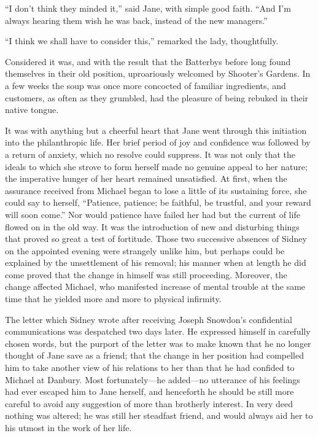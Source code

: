 ``I don't think they minded it,'' said Jane, with simple good faith.
``And I'm always hearing them wish he was back, instead of the new
managers.''

``I think we shall have to consider this,'' remarked the lady,
thoughtfully.

Considered it was, and with the result that the Batterbys before long
found themselves in their old position, uproariously welcomed by
Shooter's Gardens. In a few weeks the soup was once more concocted of
familiar ingredients, and customers, as often as they grumbled, had the
pleasure of being rebuked in their native tongue.

It was with anything but a cheerful heart that Jane went through this
initiation into the philanthropic life. Her brief period of joy and
confidence was followed by a return of anxiety, which no resolve could
suppress. It was not only that the ideals to which she strove to form
herself made no genuine appeal {}to her nature; the imperative hunger of
her heart remained unsatisfied. At first, when the assurance received
from Michael began to lose a little of its sustaining force, she could
say to herself, ``Patience, patience; be faithful, be trustful, and your
reward will soon come.'' Nor would patience have failed her had but the
current of life flowed on in the old way. It was the introduction of new
and disturbing things that proved so great a test of fortitude. Those
two successive absences of Sidney on the appointed evening were
strangely unlike him, but perhaps could be explained by the unsettlement
of his removal; his manner when at length he did come proved that the
change in himself was still proceeding. Moreover, the change affected
Michael, who manifested increase of mental trouble at the same time that
he yielded more and more to physical infirmity.

The letter which Sidney wrote after receiving Joseph Snowdon's
confidential communications was despatched two days later. He expressed
himself in carefully chosen words, but the purport of the letter was to
make known that he no longer thought of Jane save {}as a friend; that
the change in her position had compelled him to take another view of his
relations to her than that he had confided to Michael at Danbury. Most
fortunately---he added---no utterance of his feelings had ever escaped
him to Jane herself, and henceforth he should be still more careful to
avoid any suggestion of more than brotherly interest. In very deed
nothing was altered; he was still her steadfast friend, and would always
aid her to his utmost in the work of her life.

